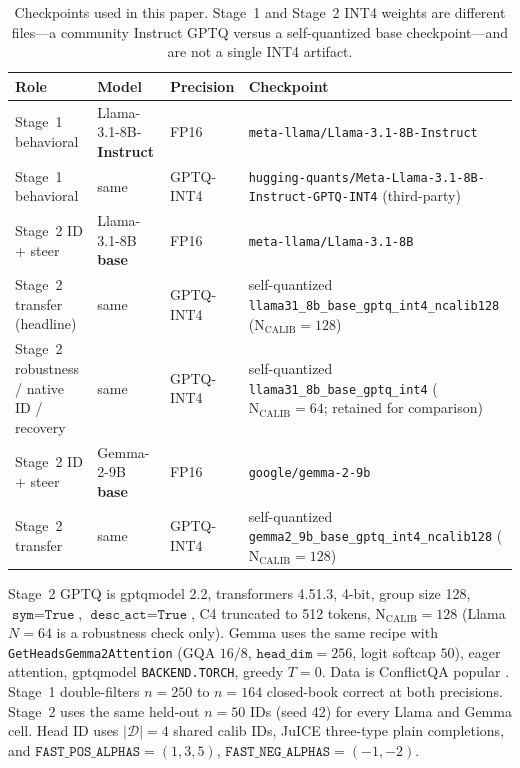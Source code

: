 \documentclass{article} %
\begin{document}
\begin{table}[t]
\caption{Checkpoints used in this paper. Stage~1 and Stage~2 INT4 weights are different files---a community Instruct GPTQ versus a self-quantized base checkpoint---and are not a single INT4 artifact.}
\label{tab:models}
\centering
\footnotesize
\setlength{\tabcolsep}{3pt}
\begin{tabular}{p{1.15in}p{0.95in}p{0.7in}p{2.15in}}
\toprule
Role & Model & Precision & Checkpoint \\
\midrule
Stage~1 behavioral & Llama-3.1-8B-\textbf{Instruct} & FP16 & \texttt{meta-llama/Llama-3.1-8B-Instruct} \\
Stage~1 behavioral & same & GPTQ-INT4 & \texttt{hugging-quants/Meta-Llama-3.1-8B-Instruct-GPTQ-INT4} (third-party) \\
Stage~2 ID + steer & Llama-3.1-8B \textbf{base} & FP16 & \texttt{meta-llama/Llama-3.1-8B} \\
Stage~2 transfer (headline) & same & GPTQ-INT4 & self-quantized \texttt{llama31\_8b\_base\_gptq\_int4\_ncalib128} ($\mathrm{N_{CALIB}{=}128}$) \\
Stage~2 robustness / native ID / recovery & same & GPTQ-INT4 & self-quantized \texttt{llama31\_8b\_base\_gptq\_int4} ($\mathrm{N_{CALIB}{=}64}$; retained for comparison) \\
Stage~2 ID + steer & Gemma-2-9B \textbf{base} & FP16 & \texttt{google/gemma-2-9b} \\
Stage~2 transfer & same & GPTQ-INT4 & self-quantized \texttt{gemma2\_9b\_base\_gptq\_int4\_ncalib128} ($\mathrm{N_{CALIB}{=}128}$) \\
\bottomrule
\end{tabular}
\end{table}

Stage~2 GPTQ is gptqmodel 2.2, transformers 4.51.3, 4-bit, group size 128, $\texttt{sym}{=}\texttt{True}$, $\texttt{desc\_act}{=}\texttt{True}$, C4 truncated to 512 tokens, $\mathrm{N_{CALIB}}{=}128$ (Llama $N{=}64$ is a robustness check only). Gemma uses the same recipe with \texttt{GetHeadsGemma2Attention} (GQA $16/8$, $\texttt{head\_dim}{=}256$, logit softcap $50$), eager attention, gptqmodel \texttt{BACKEND.TORCH}, greedy $T{=}0$. Data is ConflictQA popular \citep{xie2024adaptive}. Stage~1 double-filters $n{=}250$ to $n{=}164$ closed-book correct at both precisions. Stage~2 uses the same held-out $n{=}50$ IDs (seed 42) for every Llama and Gemma cell. Head ID uses $|\mathcal{D}|{=}4$ shared calib IDs, JuICE three-type plain completions, and $\texttt{FAST\_POS\_ALPHAS}{=}(1,3,5)$, $\texttt{FAST\_NEG\_ALPHAS}{=}(-1,-2)$.
\end{document}
